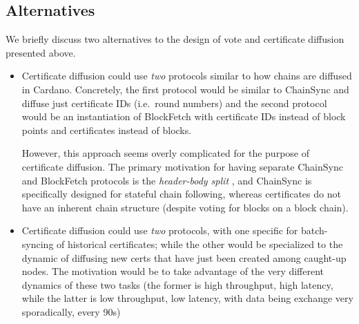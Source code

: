 \subsection{Alternatives}\label{sec:vote cert alternatives}

We briefly discuss two alternatives to the design of vote and certificate diffusion presented above.
\begin{itemize}


\item
  Certificate diffusion could use \emph{two} protocols similar to how chains are diffused in Cardano.
  Concretely, the first protocol would be similar to ChainSync and diffuse just certificate IDs (i.e.\ round numbers) and the second protocol would be an instantiation of BlockFetch with certificate IDs instead of block points and certificates instead of blocks.

  However, this approach seems overly complicated for the purpose of certificate diffusion.
  The primary motivation for having separate ChainSync and BlockFetch protocols is the \emph{header-body split} \parencite{shelley-data-diffusion-networking}, and ChainSync is specifically designed for stateful chain following, whereas certificates do not have an inherent chain structure (despite voting for blocks on a block chain).
\item
  Certificate diffusion could use \emph{two} protocols, with one specific for batch-syncing of historical certificates; while the other would be specialized to the dynamic of diffusing new certs that have just been created among caught-up nodes. The motivation would be to take advantage of the very different dynamics of these two tasks (the former is high throughput, high latency, while the latter is low throughput, low latency, with data being exchange very sporadically, every 90s)
\end{itemize}

